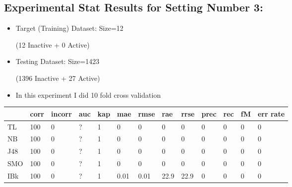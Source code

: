 \documentclass[a4paper,12pt, english]{article}
\begin{document}
\newpage

\subsection{Experimental Stat Results for Setting Number 3:}
\begin{itemize}
\item Target (Training) Dataset: Size=12 \begin{scriptsize}(12 Inactive + 0 Active)\end{scriptsize}
\item Testing Dataset: Size=1423 \begin{scriptsize}(1396 Inactive + 27 Active)\end{scriptsize}
\item In this experiment I did 10 fold cross validation
\end{itemize}  
\begin{small}
\begin{center}
    \begin{tabular}{ | l | l | l | l | l | l | l | l | l | l | l | l | l |}
    \hline
      	& corr & incorr  & auc & kap & mae & rmse & rae & rrse & prec & rec & fM & err rate\\ \hline
      	TL & 100 & 0 & ? & 1 & 0 & 0 & 0 & 0 & 0 & 0 & 0 & 0\\ \hline
	NB & 100 & 0 & ? & 1 & 0 & 0 & 0 & 0 & 0 & 0 & 0 & 0\\ \hline
	J48 & 100 & 0 & ? & 1 & 0 & 0 & 0 & 0 & 0 & 0 & 0 & 0\\ \hline
	SMO & 100 & 0 & ? & 1 & 0 & 0 & 0 & 0 & 0 & 0 & 0 & 0\\ \hline
	IBk & 100 & 0 & ? & 1 & 0.01 & 0.01 & 22.9 & 22.9 & 0 & 0 & 0 & 0\\ \hline  
    \end{tabular}       
\end{center}
\end{small}
\end{document}
